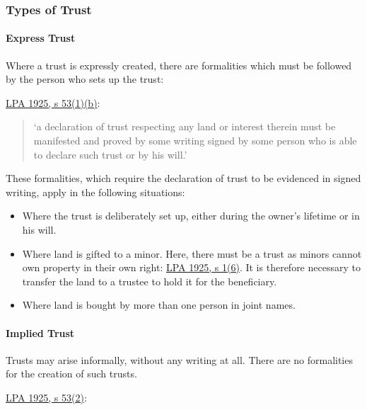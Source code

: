 \documentclass[
]{article}
\providecommand{\tightlist}{%
  \setlength{\itemsep}{0pt}\setlength{\parskip}{0pt}}
\begin{document}
\hypertarget{types-of-trust}{%
\subsubsection{Types of Trust}\label{types-of-trust}}

\hypertarget{express-trust}{%
\paragraph{Express Trust}\label{express-trust}}

Where a trust is expressly created, there are formalities which must be
followed by the person who sets up the trust:

\href{https://www.legislation.gov.uk/ukpga/Geo5/15-16/20/section/53}{LPA
1925, s 53(1)(b)}:

\begin{quote}
`a declaration of trust respecting any land or interest therein must be
manifested and proved by some writing signed by some person who is able
to declare such trust or by his will.'
\end{quote}

These formalities, which require the declaration of trust to be
evidenced in signed writing, apply in the following situations:

\begin{itemize}
\tightlist
\item
  Where the trust is deliberately set up, either during the owner's
  lifetime or in his will.
\item
  Where land is gifted to a minor. Here, there must be a trust as minors
  cannot own property in their own right:
  \href{https://www.legislation.gov.uk/ukpga/Geo5/15-16/20/section/1}{LPA
  1925, s 1(6)}. It is therefore necessary to transfer the land to a
  trustee to hold it for the beneficiary.
\item
  Where land is bought by more than one person in joint names.
\end{itemize}

\hypertarget{implied-trust}{%
\paragraph{Implied Trust}\label{implied-trust}}

Trusts may arise informally, without any writing at all. There are no
formalities for the creation of such trusts.

\href{https://www.legislation.gov.uk/ukpga/Geo5/15-16/20/section/53}{LPA
1925, s 53(2)}:
\end{document}
